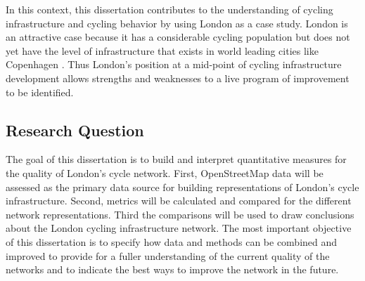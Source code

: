 In this context, this dissertation contributes to the understanding of cycling infrastructure and cycling behavior by using London as a case study. London is an attractive case because it has a considerable cycling population but does not yet have the level of infrastructure that exists in world leading cities like Copenhagen \parencite{mayor}. Thus London's position at a mid-point of cycling infrastructure development allows strengths and weaknesses to a live program of improvement to be identified.


\subsection{Research Question}
%


The goal of this dissertation is to build and interpret quantitative measures for the quality of London's cycle network. First, OpenStreetMap data will be assessed as the primary data source for building representations of London's cycle infrastructure. Second, metrics will be calculated and compared for the different network representations. Third the comparisons will be used to draw conclusions about the London cycling infrastructure network. The most important objective of this dissertation is to specify how data and methods can be combined and improved to provide for a fuller understanding of the current quality of the networks and to indicate the best ways to improve the network in the future. 

